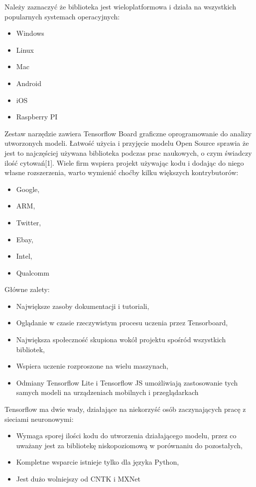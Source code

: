 \documentclass[12pt,a4paper,twoside,titlepage,openright]{book}
\begin{document}
Należy zaznaczyć że biblioteka jest wieloplatformowa i działa na wszystkich popularnych systemach operacyjnych:
\begin{itemize}
\item Windows
\item Linux
\item Mac
\item Android
\item iOS
\item Raspberry PI
\end{itemize}

Zestaw narzędzie zawiera Tensorflow Board graficzne oprogramowanie do analizy utworzonych modeli. Łatwość użycia i przyjęcie modelu Open Source sprawia że jest to najczęściej używana biblioteka podczas prac naukowych, o czym świadczy ilość cytowań[1]. Wiele firm wspiera projekt używając kodu i dodając do niego własne rozszerzenia, warto wymienić choćby kilku większych kontrybutorów:
\begin{itemize}
\item Google,
\item ARM,
\item Twitter,
\item Ebay,
\item Intel,
\item Qualcomm
\end{itemize}

Główne zalety:
\begin{itemize}
\item Największe zasoby dokumentacji i tutoriali,
\item Oglądanie w czasie rzeczywistym procesu uczenia przez Tensorboard,
\item Największa społeczność skupiona wokół projektu spośród wszystkich bibliotek,
\item Wspiera uczenie rozproszone na wielu maszynach,
\item Odmiany Tensorflow Lite i Tensorflow JS umożliwiają zastosowanie tych samych modeli na urządzeniach mobilnych i przeglądarkach
\end{itemize}

Tensorflow ma dwie wady, działające na niekorzyść osób zaczynających pracę z sieciami neuronowymi:
\begin{itemize}
\item Wymaga sporej ilości kodu do utworzenia działającego modelu, przez co uważany jest za bibliotekę niskopoziomową w porównaniu do pozostałych,
\item Kompletne wsparcie istnieje tylko dla języka Python, 
\item Jest dużo wolniejszy od CNTK i MXNet \cite{DBLP:journals/corr/ShiWXC16}
\end{itemize}
\end{document}
